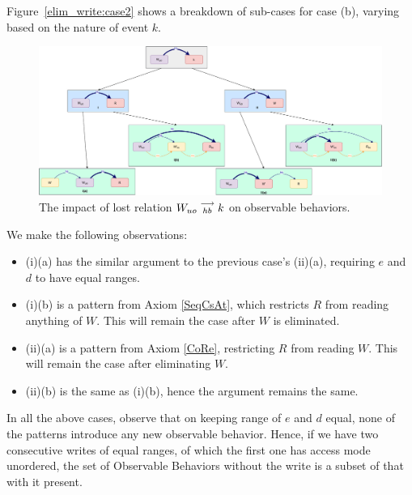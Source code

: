     Figure~\ref{elim_write:case2} shows a breakdown of sub-cases for case (b), varying based
    on the nature of event $k$.
    \begin{figure}[H]
        \centering
        \includegraphics[scale=0.3]{6.Elimination/1.ValidEliminationCandidate/WriteElimProof/ProofParts/Part4Case2.pdf}
        \caption{The impact of lost relation $W_{uo}\stackrel{\longrightarrow}{_{hb}}k$ on observable behaviors.}
        \label{elim_write:case1}
    \end{figure}

    We make the following observations:
    \begin{itemize}
        \item (i)(a) has the similar argument to the previous case's (ii)(a), requiring $e$ and $d$ to have equal ranges.
        \item (i)(b) is a pattern from Axiom \ref{SeqCsAt}, which restricts $R$ from reading anything of $W$. This will remain the case after $W$ is eliminated. 
        \item (ii)(a) is a pattern from Axiom \ref{CoRe}, restricting $R$ from reading $W$. This will remain the case after eliminating $W$.
        \item (ii)(b) is the same as (i)(b), hence the argument remains the same.  
    \end{itemize}

    In all the above cases, observe that on keeping range of $e$ and $d$ equal, none of the patterns introduce any new observable behavior. Hence, if we have two consecutive writes of equal ranges, of which the first one has access mode unordered, the set of Observable Behaviors without the write is a subset of that with it present. 

